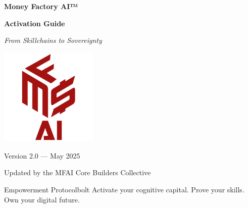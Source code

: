 
\begin{titlepage}
  \centering
  \vspace*{4cm}

  {\Huge\bfseries\color{solana-purple} Money Factory AI™\par}
  \vspace{1em}
  {\LARGE\bfseries\color{solana-green} Activation Guide\par}
  \vspace{1em}
  {\large\itshape\color{text-secondary} From Skillchains to Sovereignty\par}
  
  \vspace{2.5cm}
  \includegraphics[width=0.35\textwidth]{images/logo.png} %

  \vspace{2.5cm}
  {\large\color{text-secondary} Version 2.0 — May 2025\par}
  \vspace{0.5em}
  {\normalsize\color{text-secondary} Updated by the MFAI Core Builders Collective\par}

  \vfill
  \begin{mfai-box}{Empowerment Protocol}{bolt}
    Activate your cognitive capital. Prove your skills. Own your digital future.
  \end{mfai-box}

\end{titlepage}
